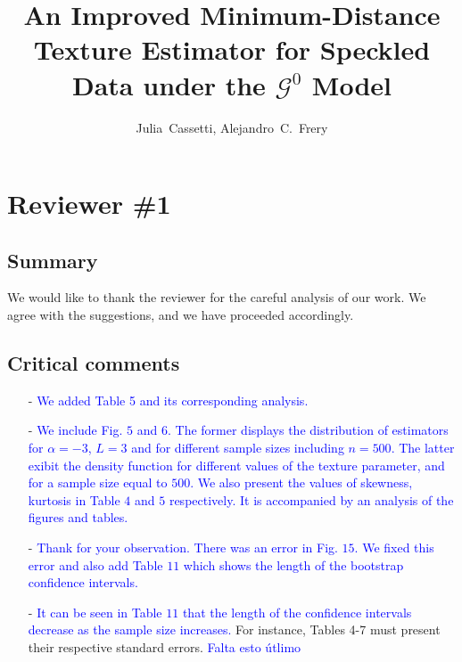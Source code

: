 \documentclass{ar2rc}
\title{An Improved Minimum-Distance Texture Estimator for Speckled Data under the $\mathcal{G}^0$ Model}
\author{Julia~Cassetti,
	Alejandro~C.~Frery}
\begin{document}
	
	\maketitle
	
	\section{Reviewer \#1}
	
	\subsection{Summary}
	

\AR We would like to thank the reviewer for the careful analysis of our work.
We agree with the suggestions, and we have proceeded accordingly.
	
	\subsection{Critical comments}


\begin{itemize}
	\item [-] \textcolor{blue}{We added Table 5 and its corresponding analysis.}
	
	\item [-] \textcolor{blue}{We include Fig. $5$ and $6$. The former displays the distribution of estimators for $\alpha=-3$, $L=3$ and for different sample sizes including $n=500$. The latter exibit the density function for different values of the texture parameter, and for a sample size equal to $500$. We also present the values of skewness, kurtosis in Table $4$ and $5$ respectively. It is accompanied by an analysis of the figures and tables.}
	
	\item [-] \textcolor{blue}{Thank for your observation. There was an error in Fig. $15$. We fixed this error and also add Table $11$ which shows the length of the bootstrap confidence intervals.}
	
	\item [-] \textcolor{blue}{It can be seen in Table $11$ that the length of the confidence intervals decrease as the sample size increases.} 
	For instance, Tables 4-7 must present their respective standard errors.
	\textcolor{blue}{Falta esto útlimo}
\end{itemize}
\end{document}
